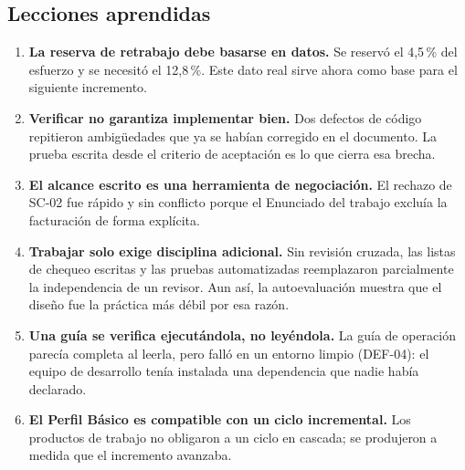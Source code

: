 \documentclass[11pt,a4paper]{article}
\begin{document}
\subsection{Lecciones aprendidas}
\begin{enumerate}
  \item \textbf{La reserva de retrabajo debe basarse en datos.} Se reservó el 4,5\,\% del esfuerzo y se necesitó el 12,8\,\%. Este dato real sirve ahora como base para el siguiente incremento.
  \item \textbf{Verificar no garantiza implementar bien.} Dos defectos de código repitieron ambigüedades que ya se habían corregido en el documento. La prueba escrita desde el criterio de aceptación es lo que cierra esa brecha.
  \item \textbf{El alcance escrito es una herramienta de negociación.} El rechazo de SC-02 fue rápido y sin conflicto porque el Enunciado del trabajo excluía la facturación de forma explícita.
  \item \textbf{Trabajar solo exige disciplina adicional.} Sin revisión cruzada, las listas de chequeo escritas y las pruebas automatizadas reemplazaron parcialmente la independencia de un revisor. Aun así, la autoevaluación muestra que el diseño fue la práctica más débil por esa razón.
  \item \textbf{Una guía se verifica ejecutándola, no leyéndola.} La guía de operación parecía completa al leerla, pero falló en un entorno limpio (DEF-04): el equipo de desarrollo tenía instalada una dependencia que nadie había declarado.
  \item \textbf{El Perfil Básico es compatible con un ciclo incremental.} Los productos de trabajo no obligaron a un ciclo en cascada; se produjeron a medida que el incremento avanzaba.
\end{enumerate}

\end{document}
